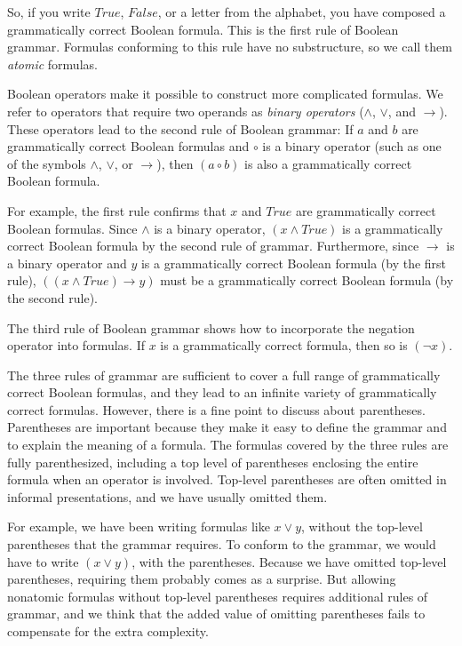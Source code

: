 So, if you write $True$, $False$, or a letter from the alphabet,
you have composed a grammatically correct Boolean formula.
This is the first rule of Boolean grammar.
Formulas conforming to this rule have no substructure,
so we call them
\emph{atomic} formulas.

Boolean operators make it possible to construct more complicated formulas.
We refer to operators that require two operands as \emph{binary operators }
($\wedge$, $\vee$, and $\rightarrow$).
These operators lead to the second rule of Boolean grammar:
If $a$ and $b$ are grammatically correct Boolean formulas
and $\circ$ is a binary operator
(such as one of the symbols $\wedge$, $\vee$, or $\rightarrow$),
then $(a \circ b)$ is also a grammatically correct Boolean formula.

For example, the first rule confirms that $x$ and $True$ are
grammatically correct Boolean formulas. Since $\wedge$ is a binary operator,
$(x \wedge True)$ is a grammatically correct Boolean formula by the
second rule of grammar. Furthermore, since $\rightarrow$ is a binary operator
and $y$ is a grammatically correct Boolean formula (by the first rule),
$((x \wedge True) \rightarrow y)$ must be a grammatically correct
Boolean formula (by the second rule).

The third rule of Boolean grammar shows
how to incorporate the negation operator into formulas.
If $x$ is a grammatically correct formula, then so is $(\neg x)$.

The three rules of grammar are sufficient to
cover a full range of grammatically correct Boolean formulas,
and they lead to an infinite variety of grammatically correct formulas.
However, there is a fine point to discuss about parentheses.
Parentheses are important because they make it easy to define
the grammar and to explain the meaning of a formula.
The formulas covered by the three rules are fully parenthesized,
including a top level of parentheses enclosing the entire formula
when an operator is involved.
Top-level parentheses are often omitted in informal presentations,
and we have usually omitted them.

For example, we have been writing formulas like $x \vee y$,
without the top-level parentheses
that the grammar requires.
To conform to the grammar,
we would have to write $(x \vee y)$, with the parentheses.
Because we have omitted top-level parentheses,
requiring them probably comes as a surprise.
But allowing nonatomic formulas without top-level parentheses
requires additional rules of grammar,
and we think that the added value of omitting parentheses
fails to compensate for the extra complexity.


